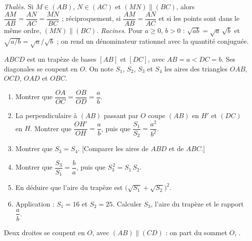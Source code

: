 \documentclass[12pt,a4paper]{article}
\begin{document}
\axmaketitle
\sommaire
\begin{rappels}
\emph{Thalès.} Si $M\in(AB)$, $N\in(AC)$ et $(MN)\parallel(BC)$, alors $\dfrac{AM}{AB}=\dfrac{AN}{AC}=\dfrac{MN}{BC}$ ;
réciproquement, si $\dfrac{AM}{AB}=\dfrac{AN}{AC}$ et si les points sont dans le même ordre, $(MN)\parallel(BC)$.
\emph{Racines.} Pour $a\geq0$, $b>0$ : $\sqrt{ab}=\sqrt a\,\sqrt b$ et $\sqrt{a/b}=\sqrt a/\sqrt b$ ; on rend un dénominateur
rationnel avec la quantité conjuguée.
\end{rappels}
\begin{corr}[title={Aires dans un trapèze}, stars=4]
$ABCD$ est un trapèze de bases $[AB]$ et $[DC]$, avec $AB=a<DC=b$. Ses diagonales se coupent en $O$. On note $S_1$, $S_2$, $S_3$ et $S_4$ les aires des triangles $OAB$, $OCD$, $OAD$ et $OBC$.

\begin{center}
\end{center}
\begin{enumerate}
  \item Montrer que $\dfrac{OA}{OC}=\dfrac{OB}{OD}=\dfrac ab$.
  \item La perpendiculaire à $(AB)$ passant par $O$ coupe $(AB)$ en $H'$ et $(DC)$ en $H$. Montrer que $\dfrac{OH'}{OH}=\dfrac ab$, puis que $\dfrac{S_1}{S_2}=\dfrac{a^2}{b^2}$.
  \item Montrer que $S_3=S_4$. [Comparer les aires de $ABD$ et de $ABC$.]
  \item Montrer que $\dfrac{S_3}{S_1}=\dfrac ba$, puis que $S_3^{\,2}=S_1\,S_2$.
  \item En déduire que l'aire du trapèze est $\big(\sqrt{S_1}+\sqrt{S_2}\big)^2$.
  \item Application : $S_1=16$ et $S_2=25$. Calculer $S_3$, l'aire du trapèze et le rapport $\dfrac ab$.
\end{enumerate}
\axsol
\begin{prop}
Deux droites se coupent en $O$, avec $(AB)\parallel(CD)$ : on part du sommet $O$, .


\end{prop}
\end{corr}
\end{document}
